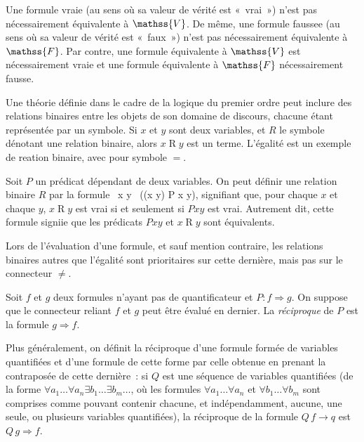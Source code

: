 \blank[medium]

\noindent{} 
Une formule vraie (au sens où sa valeur de vérité est « vrai ») n'est pas nécessairement équivalente à $\mathss{V}$.
De même, une formule faussee (au sens où sa valeur de vérité est « faux ») n'est pas nécessairement équivalente à $\mathss{F}$.
Par contre, une formule équivalente à $\mathss{V}$ est nécessairement vraie et une formule équivalente à $\mathss{F}$ nécessairement fausse.

\stopsubsection


\startsubsection[
  title=Relations binaires,
  reference=subsub:relations_binaires]

Une théorie définie dans le cadre de la logique du premier ordre peut inclure des relations binaires entre les objets de son domaine de discours, chacune étant représentée par un symbole. 
Si $x$ et $y$ sont deux variables, et $R$ le symbole dénotant une relation binaire, alors $x \mathrel{R} y$ est un terme. 
L'égalité est un exemple de reation binaire, avec pour symbole $=$. 

Soit $P$ un prédicat dépendant de deux variables. 
On peut définir une relation binaire $R$ par la formule 
\startformula
  \forall x \forall y \, ((x  y) \Leftrightarrow P x y),
\stopformula
signifiant que, pour chaque $x$ et chaque $y$, $x \mathrel{R} y$ est vrai si et seulement si $P x y$ est vrai. 
Autrement dit, cette formule signiie que les prédicats $P x y$ et $x \mathrel{R} y$ sont équivalents.

Lors de l'évaluation d'une formule, et sauf mention contraire, les relations binaires autres que l'égalité sont prioritaires sur cette dernière, mais pas sur le connecteur $\neq$.

\stopsubsection


\startsubsection[title=Réciproque]

Soit $f$ et $g$ deux formules n'ayant pas de quantificateur et $P: f \Rightarrow g$. 
On suppose que le connecteur reliant $f$ et $g$ peut être évalué en dernier.
La \emph{réciproque} de $P$ est la formule $g \Rightarrow f$. 

Plus généralement, on définit la réciproque d'une formule formée de variables quantifiées et d'une formule de cette forme par celle obtenue en prenant la contraposée de cette dernière : si $Q$ est une séquence de variables quantifiées (de la forme $\forall a_1 \dots \forall a_n \exists b_1 \dots \exists b_m \dots$, où les formules $\forall a_1 \dots \forall a_n$ et $\forall b_1 \dots \forall b_m$ sont comprises comme pouvant contenir chacune, et indépendamment, aucune, une seule, ou plusieurs variables quantifiées), la réciproque de la formule $Q \, f \rightarrow q$ est $Q \, g \Rightarrow f$. 

